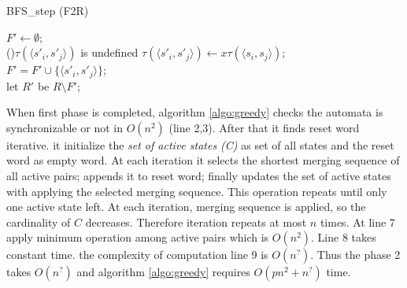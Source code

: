 \documentclass[12pt]{article}
\newcommand{\comment}[2]{{\color{red}{\bf (#1: #2)}}}
\begin{document}
\renewcommand{\baselinestretch}{0.9}
\begin{algorithm}
	\label{algo:BFS-step-F2R}
	\caption{{BFS\_step (F2R)}}
	
	
	$F' \longleftarrow \emptyset$;\\
	{
		{
			{
				\If(){$\tau(\langle s'_i,s'_j\rangle)$ is undefined}
				{
					$\tau(\langle s'_i,s'_j\rangle) \longleftarrow x \tau(\langle s_i,s_j \rangle)$;\\
					$F' = F' \cup \{ \langle s'_i,s'_j\rangle  \} $;\\
				}
			}
		}
	}
	let $R'$ be $R \setminus F'$;
\end{algorithm}
\renewcommand{\baselinestretch}{1}

When first phase is completed, algorithm \ref{algo:greedy} checks the automata is synchronizable or not in $O(n^2)$ (line 2,3). After that it finds reset word iterative. it initialize the \textit{set of active states (C)} as set of all states and the reset word as empty word. At each iteration it selects the shortest merging sequence of all active pairs; appends it to reset word; finally updates the set of active states with applying the selected merging sequence. This operation repeats until only one active state left. At each iteration, merging sequence is applied, so the cardinality of $C$ decreases. Therefore iteration repeats at most $n$ times. At line 7 apply minimum operation among active pairs which is $O(n^2)$. Line 8 takes constant time. the complexity of computation line 9 is $O(n^?)$. Thus the phase 2 takes $O(n^?)$ and algorithm \ref{algo:greedy} requires $O(pn^2 + n^?)$ time.\comment{sertac}{mailde yazdigima gore revize etmek gerek.}
\end{document}
